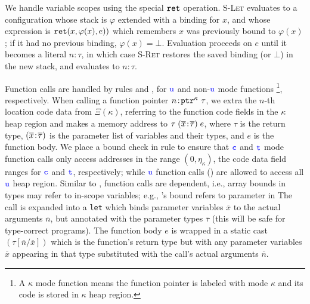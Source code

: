 We handle variable scopes using the special $\mathtt{ret}$
operation. \textsc{S-Let} evaluates to a configuration whose stack
is $\varphi$ extended with a binding for $x$, and whose expression is
$\mathtt{ret}({x},{\varphi(x)},{e}))$ which remembers $x$ was previously bound to
$\varphi(x)$; if it had no previous binding, $\varphi(x) =
\bot$. Evaluation proceeds on $e$ until it becomes a literal
$n\!:\!\tau$, in which case \textsc{S-Ret} restores the saved
binding (or $\bot$) in the new stack, and evaluates to
$n\!:\!\tau$. 

Function calls are handled by rules  and ,
for $\textcolor{blue}{\texttt{u}}$ and non-$\textcolor{blue}{\texttt{u}}$ mode functions \footnote{A $\kappa$ mode function means the function pointer is labeled with mode $\kappa$ and its code is stored in $\kappa$ heap region.}, respectively.
When calling a function pointer ${n}\!:\!{\mathtt{ptr}^{\kappa}~{\tau}}$,
we extra the $n$-th location code data from $\Xi(\kappa)$, referring to the function code fields in the $\kappa$ heap region and makes a memory address to $\tau\;({\overline{x}}\!:\!{\overline{\tau}})\;e$, where
$\tau$ is the return type, $({\overline{x}}\!:\!{\overline{\tau}})$
is the parameter list of variables and their types, and $e$ is the
function body.
We place a bound check in rule  to 
ensure that $\textcolor{blue}{\texttt{c}}$ and $\textcolor{blue}{\texttt{t}}$ mode function calls only access addresses in the range $(0,\eta_{\kappa})$,
the code data field ranges for $\textcolor{blue}{\texttt{c}}$ and $\textcolor{blue}{\texttt{t}}$, respectively;
while $\textcolor{blue}{\texttt{u}}$ function calls () are allowed to access all $\textcolor{blue}{\texttt{u}}$ heap region.
Similar to \checkedc, \lang function calls are dependent, i.e.,
array bounds in types may refer to in-scope variables; e.g., 
's bound  refers to parameter  in 
The call is expanded into a \texttt{let} which binds
parameter variables $\overline{x}$ to the actual arguments
$\overline{n}$, but annotated with the parameter types
$\overline{\tau}$ (this will be safe for type-correct programs). The
function body $e$ is wrapped in a static cast
$(\tau[\overline{n} / \overline{x}])$ which is the function's return
type but with any parameter variables $\overline{x}$ appearing in that
type substituted with the call's actual arguments $\overline{n}$. 
